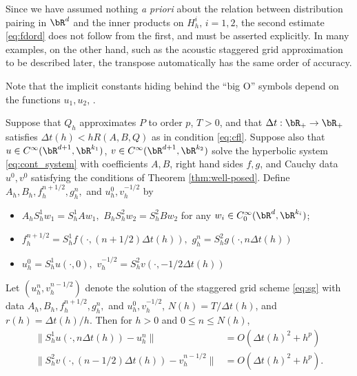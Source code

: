 Since we have assumed nothing {\em a priori} about the relation between distribution
pairing in $\bR^d$ and the inner products on $H^i_h, \,i=1,2$, 
the second estimate \ref{eq:fdord} does not follow from the first, and must be
asserted explicitly. In many examples, on the other hand, such as the
acoustic staggered grid approximation to be described later, the 
transpose automatically has the same order of accuracy.

Note that the implicit constants hiding behind the ``big O'' symbols
depend on the functions $u_1, u_2$, . 

\begin{theorem}
\label{thm:smconvg}
Suppose that $Q_h$ approximates $P$ to order $p$, $T>0$, and that $\Delta t:
\bR_+ \rightarrow \bR_+$ satisfies $\Delta t(h) <
hR(A,B,Q)$ as in condition \ref{eq:cfl}. Suppose also that $u \in C^{\infty}(\bR^{d+1},\bR^{k_1})$, $v \in
  C^{\infty}(\bR^{d+1},\bR^{k_2})$ solve the hyperbolic system
  \ref{eq:cont_system} with coefficients $A,B$, right hand sides
  $f,g$, and Cauchy data $u^0,v^0$ satisfying the conditions of
  Theorem \ref{thm:well-posed}. Define
  $A_h,B_h,f^{n+1/2}_h,g^{n}_h,$ and $u^0_h,v^{-1/2}_h$ by
\begin{itemize}
\item $A_h S^1_hw_1=S^1_h Aw_1, \,\,B_hS^2_hw_2 = S^2_hBw_2$ for any $w_i
  \in C_0^{\infty}(\bR^d,\bR^{k_i})$; 
\item $f^{n+1/2}_h = S^1_hf(\cdot,(n+1/2)\Delta t(h)),\,\, g^n_h=S^2_h
  g(\cdot,n\Delta t(h))$
\item $u^0_h=S^1_hu(\cdot,0),\,\, v^{-1/2}_h=S^2_hv(\cdot,-1/2 \Delta
  t(h))$
\end{itemize}
Let $(u^n_h,v^{n-1/2}_h)$ denote the solution of the staggered grid
scheme \ref{eq:sg} with data $A_h,B_h,f^{n+1/2}_h,g^{n}_h,$ and
$u^0_h,v^{-1/2}_h$, $N(h)=T/\Delta t(h)$, and $r(h) = \Delta
t(h)/h$. Then for $h>0$ and $0 \le n \le N(h)$, 
\begin{equation}
\label{eq:errest}
\begin{split}
\|S^1_hu(\cdot,n \Delta t(h)) - u^n_h\| &= O(\Delta t(h)^2+h^p)\\
\|S^2_hv(\cdot,(n-1/2)\Delta t(h)) - v^{n-1/2}_h\| & = O(\Delta
t(h)^2 +h^p).
\end{split}
\end{equation}
\end{theorem}


